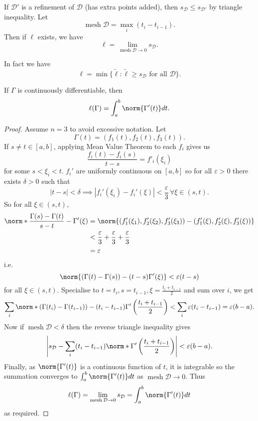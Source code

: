 \documentclass[a4paper]{article}
\theoremstyle{definition}
\DeclareMathOperator{\mesh}{mesh}
\begin{document}
If \(\mathcal D'\) is a refinement of \(\mathcal D\) (has extra points added), then \(s_{\mathcal D} \leq s_{\mathcal D'}\) by triangle inequality. Let
\[
  \mesh \mathcal D = \max_i(t_i - t_{i - 1}).
\]
Then if \(\ell\) exists, we have
\[
  \ell = \lim_{\mesh \mathcal D \to 0} s_{\mathcal D}.
\]

\begin{note}
  In fact we have
  \[
    \ell = \min\{\tilde \ell: \tilde \ell \geq s_{\mathcal D} \text{ for all } \mathcal D\}.
  \]
\end{note}

\begin{proposition}
  If \(\Gamma\)  is continuously differentiable, then
  \[
    \ell(\Gamma) = \int_a^b \norm{\Gamma'(t)} dt.
  \]
\end{proposition}

\begin{proof}
  Assume \(n = 3\) to avoid excessive notation. Let
  \[
    \Gamma(t) = (f_1(t), f_2(t), f_3(t)).
  \]
  If \(s \neq t \in [a, b]\), applying Mean Value Theorem to each \(f_i\) gives us
  \[
    \frac{f_i(t) - f_i(s)}{t - s} = f'_i(\xi_i)
  \]
  for some \(s < \xi_i < t\). \(f_i'\) are uniformly continuous on \([a, b]\) so for all \(\varepsilon > 0\) there exists \(\delta > 0\) such that
  \[
    |t - s| < \delta \implies |f_i'(\xi_i) - f_i'(\xi)| < \frac{\varepsilon}{3} \, \forall \xi \in (s, t).
  \]
  So for all \(\xi \in (s, t)\),
  \begin{align*}
    \norm*{\frac{\Gamma(s) - \Gamma(t)}{s - t} - \Gamma'(\xi)} &= \norm{(f_1'(\xi_1), f_2'(\xi_2), f_3'(\xi_3)) - (f_1'(\xi), f_2'(\xi), f_3'(\xi))} \\
                                                               &< \frac{\varepsilon}{3} + \frac{\varepsilon}{3} +\frac{\varepsilon}{3} \\
                                                               &= \varepsilon
  \end{align*}
  i.e.
  \[
    \norm{(\Gamma(t) - \Gamma(s)) - (t - s)\Gamma'(\xi)} < \varepsilon(t - s)
  \]
  for all \(\xi \in (s, t)\). Specialise to \(t = t_i, s= t_{i - 1}, \xi = \frac{t_i + t_{i - 1}}{2}\) and sum over \(i\), we get
  \[
    \sum_i \norm*{(\Gamma(t_i) - \Gamma(t_{i - 1})) - (t_i - t_{i - 1}) \Gamma'\left(\frac{t_i + t_{i - 1}}{2}\right)} < \sum_i \varepsilon(t_i - t_{i - 1}) = \varepsilon(b - a).
  \]
  Now if \(\mesh \mathcal D < \delta\) then the reverse triangle inequality gives
  \[
    \left|s_{\mathcal D}  - \sum_i (t_i - t_{i - 1}) \norm*{\Gamma'\left(\frac{t_i + t_{i - 1}}{2}\right)}\right| < \varepsilon (b - a).
  \]
  Finally, as \(\norm{\Gamma'(t)}\) is a continuous function of \(t\), it is integrable so the summation converges to \(\int_a^b \norm{\Gamma'(t)} dt\) as \(\mesh \mathcal D \to 0\). Thus
  \[
    \ell(\Gamma) = \lim_{\mesh \mathcal D \to 0} s_{\mathcal D} = \int_a^b \norm{\Gamma'(t)} dt
  \]
  as required.
\end{proof}
\end{document}
